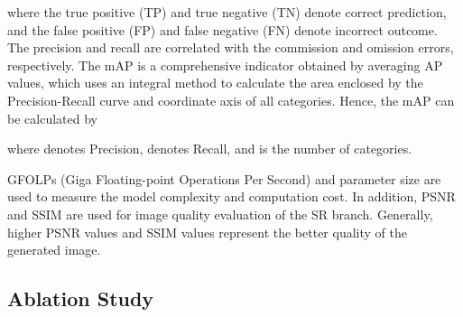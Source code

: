\begin{table}[htpb]
	\small
\centering
\vspace{-0.1in}
\end{table} where the true positive (TP) and true negative (TN) denote correct prediction, and the false positive (FP) and false negative (FN) denote incorrect outcome. The precision and recall are correlated with the commission and omission errors, respectively. The mAP is a comprehensive indicator obtained by averaging AP values, which uses an integral method to calculate the area enclosed by the Precision-Recall curve and coordinate axis of all categories. Hence, the mAP can be calculated by

where   denotes Precision,  denotes Recall, and  is the number of categories. 

GFOLPs (Giga Floating-point Operations Per Second) and parameter size are used to measure the model complexity and computation cost. In addition, PSNR and SSIM are used for image quality evaluation of the SR branch. Generally, higher PSNR values and SSIM values represent the better quality of the generated image.



\subsection{Ablation Study}
\label{sec: Ablation Study}

